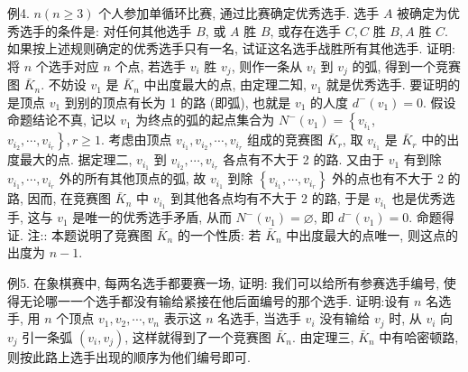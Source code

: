 例4. $n(n \geqslant 3)$ 个人参加单循环比赛, 通过比赛确定优秀选手.
选手 $A$ 被确定为优秀选手的条件是: 对任何其他选手 $B$, 或 $A$ 胜 $B$, 或存在选手 $C, C$ 胜 $B, A$ 胜 $C$. 如果按上述规则确定的优秀选手只有一名, 试证这名选手战胜所有其他选手.
证明:将 $n$ 个选手对应 $n$ 个点, 若选手 $v_i$ 胜 $v_j$, 则作一条从 $v_i$ 到 $v_j$ 的弧, 得到一个竞赛图 $\bar{K}_n$. 不妨设 $v_1$ 是 $\bar{K}_n$ 中出度最大的点, 由定理二知, $v_1$ 就是优秀选手.
要证明的是顶点 $v_1$ 到别的顶点有长为 1 的路 (即弧), 也就是 $v_1$ 的人度 $d^{-}\left(v_1\right)=0$.
假设命题结论不真, 记以 $v_1$ 为终点的弧的起点集合为 $N^{-}\left(v_1\right)=\left\{v_{i_1}\right.$, $\left.v_{i_2}, \cdots, v_{i_r}\right\}, r \geqslant 1$. 考虑由顶点 $v_{i_1}, v_{i_2}, \cdots, v_{i_r}$ 组成的竞赛图 $\bar{K}_r$, 取 $v_{i_1}$ 是 $\bar{K}_r$ 中的出度最大的点.
据定理二, $v_{i_1}$ 到 $v_{i_2}, \cdots, v_{i_r}$ 各点有不大于 2 的路.
又由于 $v_1$ 有到除 $v_{i_1}, \cdots, v_{i_r}$ 外的所有其他顶点的弧, 故 $v_{i_1}$ 到除 $\left\{v_{i_1}, \cdots, v_{i_r}\right\}$ 外的点也有不大于 2 的路, 因而, 在竞赛图 $\bar{K}_n$ 中 $v_{i_1}$ 到其他各点均有不大于 2 的路, 于是 $v_{i_1}$ 也是优秀选手, 这与 $v_1$ 是唯一的优秀选手矛盾, 从而 $N^{-}\left(v_1\right)= \varnothing$, 即 $d^{-}\left(v_1\right)=0$. 命题得证.
注:: 本题说明了竞赛图 $\bar{K}_n$ 的一个性质: 若 $\bar{K}_n$ 中出度最大的点唯一, 则这点的出度为 $n-1$.



例5. 在象棋赛中, 每两名选手都要赛一场, 证明: 我们可以给所有参赛选手编号, 使得无论哪一一个选手都没有输给紧接在他后面编号的那个选手.
证明:设有 $n$ 名选手, 用 $n$ 个顶点 $v_1, v_2, \cdots, v_n$ 表示这 $n$ 名选手, 当选手 $v_i$ 没有输给 $v_j$ 时, 从 $v_i$ 向 $v_j$ 引一条弧 $\left(v_i, v_j\right)$, 这样就得到了一个竞赛图 $\bar{K}_n$. 由定理三, $\bar{K}_n$ 中有哈密顿路, 则按此路上选手出现的顺序为他们编号即可.


